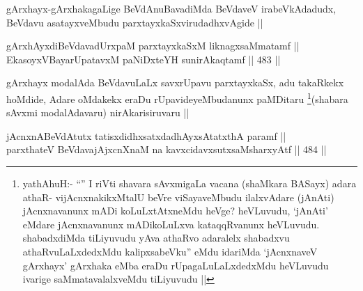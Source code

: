 \begin{artha}
gArxhayx-gArxhakagaLige BeVdAnuBavadiMda BeVdaveV irabeVkAdadudx, BeVdavu asatayxveMbudu parxtayxkaSxvirudadhxvAgide ||
\end{artha}

\begin{shl}
gArxhAyxdiBeVdavadUrxpaM parxtayxkaSxM liknagxsaMmatamf ||  \\
EkasoyxVBayarUpatavxM paNiDxteYH sunirAkaqtamf ||  483 ||  
\end{shl}

\begin{artha}
gArxhayx modalAda BeVdavuLaLx savxrUpavu parxtayxkaSx, adu takaRkekx hoMdide, Adare oMdakekx eraDu rUpavideyeMbudanunx paMDitaru \footnote{yathAhuH:- ``\stext'' I riVti shavara sAvxmigaLa vacana (shaMkara BASayx) adara athaR- vijAcnxnakikxMtalU beVre viSayaveMbudu ilalxvAdare (jAnAti) jAcnxnavanunx mADi koLuLxtAtxneMdu heVge? heVLuvudu, `jAnAti' eMdare jAcnxnavanunx mADikoLuLxva kataqqRvanunx heVLuvudu. shabadxdiMda tiLiyuvudu yAva athaRvo adaralelx shabadxvu athaRvuLaLxdedxMdu kalipxsabeVku'' eMdu idariMda `jAcnxnaveV gArxhayx' gArxhaka eMba eraDu rUpagaLuLaLxdedxMdu heVLuvudu ivarige saMmatavalalxveMdu tiLiyuvudu ||}(shabara sAvxmi modalAdavaru) nirAkarisiruvaru ||
\end{artha}


\begin{shl}
jAcnxnABeVdAtutx tatisxdidhxsatxdadhAyxsAtatxthA paramf || \\
parxthateV BeVdavajAjxcnXnaM na kavxcidavxsutxsaMsharxyAtf ||  484 ||  
\end{shl}

